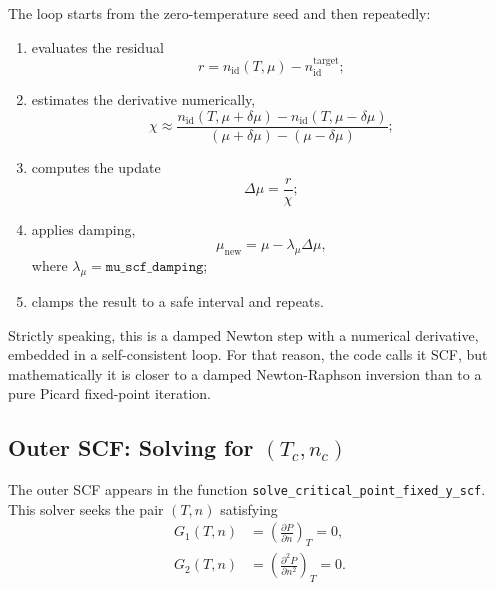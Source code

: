 \documentclass[11pt]{article}
\begin{document}
The loop starts from the zero-temperature seed and then repeatedly:
\begin{enumerate}
\item evaluates the residual
\[
r = n_{\mathrm{id}}(T,\mu) - n_{\mathrm{id}}^{\mathrm{target}};
\]
\item estimates the derivative numerically,
\begin{equation}
\chi \approx
\frac{n_{\mathrm{id}}(T,\mu+\delta\mu) -
n_{\mathrm{id}}(T,\mu-\delta\mu)}
{(\mu+\delta\mu)-(\mu-\delta\mu)};
\end{equation}
\item computes the update
\begin{equation}
\Delta\mu = \frac{r}{\chi};
\end{equation}
\item applies damping,
\begin{equation}
\mu_{\mathrm{new}} = \mu - \lambda_\mu \Delta\mu,
\end{equation}
where $\lambda_\mu = \texttt{mu\_scf\_damping}$;
\item clamps the result to a safe interval and repeats.
\end{enumerate}

Strictly speaking, this is a damped Newton step with a numerical derivative,
embedded in a self-consistent loop. For that reason, the code calls it SCF,
but mathematically it is closer to a damped Newton-Raphson inversion than to a
pure Picard fixed-point iteration.

\subsection{Outer SCF: Solving for \texorpdfstring{$(T_c,n_c)$}{(Tc,nc)}}

The outer SCF appears in the function
\texttt{solve\_critical\_point\_fixed\_y\_scf}. This solver seeks the pair
$(T,n)$ satisfying
\begin{align}
G_1(T,n) &= \left(\frac{\partial P}{\partial n}\right)_T = 0, \\
G_2(T,n) &= \left(\frac{\partial^2 P}{\partial n^2}\right)_T = 0.
\end{align}
\end{document}
